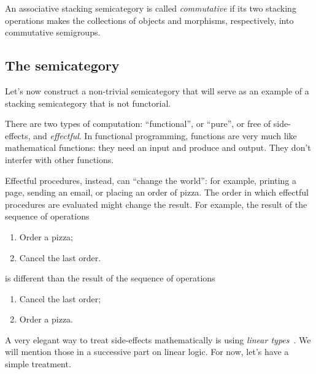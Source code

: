 %
\begin{definition}
    An associative stacking semicategory is called \emph{commutative} if its two stacking operations makes the collections of objects and morphisms, respectively, into commutative semigroups.
\end{definition}

\subsection{The semicategory \Effects}

Let's now construct a non-trivial semicategory that will serve as an example of a stacking semicategory that is not functorial.

There are two types of computation: ``functional'', or ``pure'', or free of side-effects, and \emph{effectful}.
In functional programming, functions are very much like mathematical functions: they need an input and produce and output.
They don't interfer with other functions.

Effectful procedures,  instead, can ``change the world'': for example, printing a page, sending an email, or placing an order of pizza.
The order in which effectful procedures are evaluated might change the result.
For example, the result of the sequence of operations
%
\begin{enumerate}
    \item Order a pizza;
    \item Cancel the last order.
\end{enumerate}
%
is different than the result of the sequence of operations
%
\begin{enumerate}
    \item Cancel the last order;
    \item Order a pizza.
\end{enumerate}

A very elegant way to treat side-effects mathematically is using \emph{linear types}~\cite{Wadler90lineartypes}.
We will mention those in a successive part on linear logic.
For now, let's have a simple treatment.

\begin{marginfigure}
    \centering
    \\
    \caption{}
    \label{fig:effects12}
\end{marginfigure}

